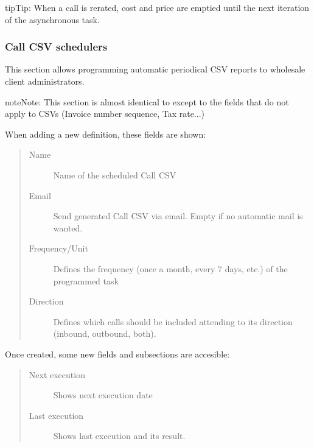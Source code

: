 \documentclass[letterpaper,10pt,english]{sphinxmanual}
\begin{document}
\begin{notice}{tip}{Tip:}
When a call is rerated, cost and price are emptied until the next iteration of the asynchronous task.
\end{notice}


\subsubsection{Call CSV schedulers}
\label{administration_portal/client/wholesale/calls/call_csv_schedulers:call-csv-schedulers}\label{administration_portal/client/wholesale/calls/call_csv_schedulers::doc}
This section allows programming automatic periodical CSV reports to wholesale client administrators.

\begin{notice}{note}{Note:}
This section is almost identical to {\hyperref[administration_portal/brand/invoicing/invoice_schedulers:invoice\string-schedulers]{}} except to the
fields that do not apply to CSVs (Invoice number sequence, Tax rate...)
\end{notice}

When adding a new definition, these fields are shown:
\begin{quote}
\begin{description}
\item[{Name}] \leavevmode
Name of the scheduled Call CSV

\item[{Email}] \leavevmode
Send generated Call CSV via email. Empty if no automatic mail is wanted.

\item[{Frequency/Unit}] \leavevmode
Defines the frequency (once a month, every 7 days, etc.) of the programmed task

\item[{Direction}] \leavevmode
Defines which calls should be included attending to its direction (inbound, outbound, both).

\end{description}
\end{quote}

Once created, some new fields and subsections are accesible:
\begin{quote}
\begin{description}
\item[{Next execution}] \leavevmode
Shows next execution date

\item[{Last execution}] \leavevmode
Shows last execution and its result.

\end{description}
\end{quote}
\end{document}
